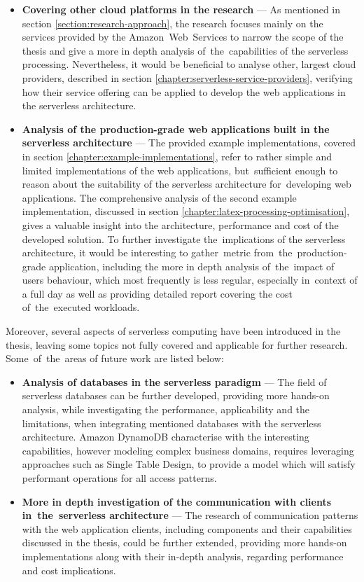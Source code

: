\begin{itemize}
   \item \textbf{Covering other cloud platforms in the research} ---
   As mentioned in section \ref{section:research-approach}, the research focuses mainly on the services provided by the Amazon~Web~Services to narrow the scope of the thesis and give a more in depth analysis of~the~capabilities of the serverless processing.
   Nevertheless, it would be beneficial to analyse other, largest cloud providers, described in section \ref{chapter:serverless-service-providers}, verifying how their service offering can be applied to develop the web applications in the serverless architecture.
   \item \textbf{Analysis of the production-grade web applications built in the serverless architecture} ---
   The provided example implementations, covered in section \ref{chapter:example-implementations}, refer to rather simple and limited implementations of the web applications, but~sufficient enough to reason about the suitability of the serverless architecture for~developing web applications.
   The comprehensive analysis of the second example implementation, discussed in section \ref{chapter:latex-processing-optimisation}, gives a valuable insight into the architecture, performance and cost of the developed solution.
   To further investigate the~implications of the serverless architecture, it would be interesting to gather~metric from~the~production-grade application, including the more in depth analysis of~the~impact of users behaviour, which most frequently is less regular, especially in~context of a full day as well as providing detailed report covering the cost of~the~executed workloads.
\end{itemize}

Moreover, several aspects of serverless computing have been introduced in the thesis, leaving some topics not fully covered and applicable for further research.
Some~of~the~areas of future work are listed below:

\begin{itemize}
   \item \textbf{Analysis of databases in the serverless paradigm} ---
   The field of serverless databases can be further developed, providing more hands-on analysis, while investigating the performance, applicability and the limitations, when integrating mentioned databases with the serverless architecture.
   Amazon DynamoDB characterise with the interesting capabilities, however modeling complex business domains, requires leveraging approaches such as Single Table Design, to provide a model which will satisfy performant operations for all access patterns.
   \item \textbf{More in depth investigation of the communication with clients in~the~serverless architecture} ---
   The research of communication patterns with the web application clients, including components and their capabilities discussed in the thesis, could be further extended, providing more hands-on implementations along with their in-depth analysis, regarding performance and cost implications.
\end{itemize}

